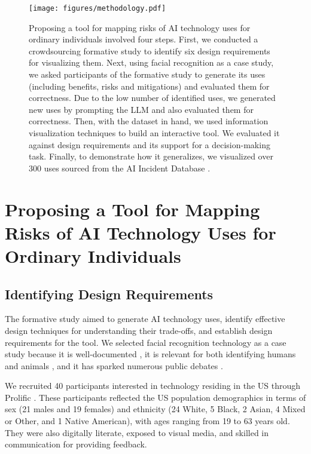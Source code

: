 \begin{figure*}[t!]
  \centering
  \texttt{[image: figures/methodology.pdf]}
  \caption{Proposing a tool for mapping risks of AI technology uses for ordinary individuals involved four steps. First, we conducted a crowdsourcing formative study to identify six design requirements for visualizing them. Next, using facial recognition as a case study, we asked participants of the formative study to generate its uses (including benefits, risks and mitigations) and evaluated them for correctness. Due to the low number of identified uses, we generated new uses by prompting the LLM and also evaluated them for correctness. Then, with the dataset in hand, we used information visualization techniques to build an interactive tool. We evaluated it against design requirements and its support for a decision-making task. Finally, to demonstrate how it generalizes, we visualized over 300 uses sourced from the AI Incident Database \cite{mcgregor2021preventing}.}
  \label{fig:methods}
\end{figure*}

\section{Proposing a Tool for Mapping Risks of AI Technology Uses for Ordinary Individuals}

\subsection{Identifying Design Requirements}
\label{sec:formative_study}

The formative study aimed to generate AI technology uses, identify effective design techniques for understanding their trade-offs, and establish design requirements for the tool. We selected facial recognition technology as a case study because it is well-documented \cite{facialRecognitionReview}, it is relevant for both identifying humans \cite{moraes2021smile} and animals \cite{Roberts2023_animals}, and it has sparked numerous public debates \cite{crawford2019halt}.

We recruited 40 participants interested in technology residing in the US through Prolific \cite{prolific}. These participants reflected the US population demographics \cite{census_ethnicity_2020, census_age_gender_2022} in terms of sex (21 males and 19 females) and ethnicity (24 White, 5 Black, 2 Asian, 4 Mixed or Other, and 1 Native American), with ages ranging from 19 to 63 years old. They were also digitally literate, exposed to visual media, and skilled in communication for providing feedback.

